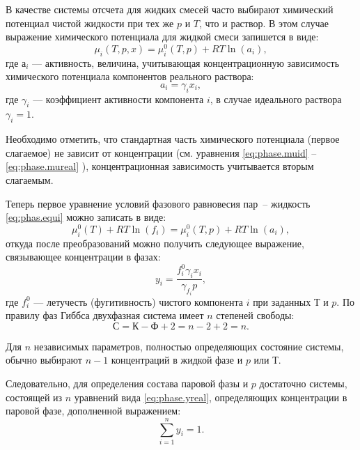 В качестве системы отсчета для жидких смесей часто выбирают химический потенциал чистой жидкости  при тех же $p$ и $T$, что и раствор. В этом случае выражение химического потенциала для жидкой смеси запишется в виде:
\begin{equation}
	\mu_i(T,p,x)=\mu_i^0(T,p)+R T \ln (a_i),
\end{equation}
где $а_i$ --- активность, величина, учитывающая концентрационную зависимость химического потенциала компонентов реального раствора:
\begin{equation}
	a_i=\gamma_i x_i,
\end{equation}
где $\gamma_i$ --- коэффициент активности компонента $i$, в случае идеального раствора $\gamma_i =1 $.

Необходимо отметить, что стандартная часть химического потенциала (первое слагаемое) не зависит от концентрации (см. уравнения \eqref{eq:phase.muid} -- \eqref{eq:phase.mureal} ), концентрационная зависимость учитывается вторым слагаемым.

Теперь первое уравнение условий фазового равновесия пар~-- жидкость \eqref{eq:phas.equi} можно записать в виде:
\begin{equation}
	\mu_i^0(T)+RT \ln (f_i)=\mu_i^0(T,p)+ R T \ln (a_i),
\end{equation}
откуда после преобразований можно получить следующее выражение, связывающее концентрации в фазах:
\begin{equation} \label{eq:phase.yreal}
	y_i=\dfrac{f_i^0 \gamma_i x_i}{\gamma_{f_i} p},
\end{equation}
где $f_i^0$ --- летучесть (фугитивность) чистого компонента $i$ при заданных $Т$ и $p$. 
По правилу фаз Гиббса двухфазная система имеет $n$ степеней свободы:
\begin{equation*}
	С=К-Ф+2=n-2+2=n.
\end{equation*}

Для $n$ независимых параметров, полностью определяющих состояние системы, обычно выбирают $n-1$ концентраций в жидкой фазе и $p$ или $Т$.

Следовательно, для определения состава паровой	 фазы и $p$ достаточно системы, состоящей из $n$ уравнений вида \eqref{eq:phase.yreal}, определяющих концентрации в паровой фазе, дополненной выражением:
\begin{equation}
	\sum\limits_{i=1}^{n} y_i =1.
\end{equation}

